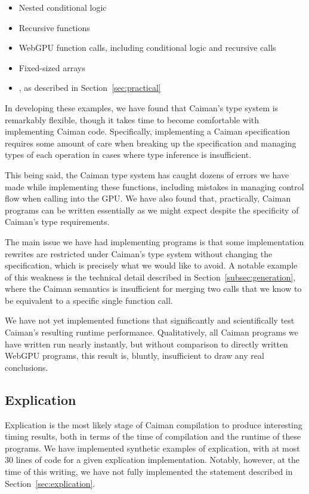 \begin{itemize}
\item Nested conditional logic
\item Recursive functions 
\item WebGPU function calls, including conditional logic and recursive calls
\item Fixed-sized arrays
\item {}, as described in Section~\ref{sec:practical}
\end{itemize}

In developing these examples, we have found that Caiman's type system is remarkably flexible, though it takes time to become comfortable with implementing Caiman code.  Specifically, implementing a Caiman specification requires some amount of care when breaking up the specification and managing types of each operation in cases where type inference is insufficient.  

This being said, the Caiman type system has caught dozens of errors we have made while implementing these functions, including mistakes in managing control flow when calling into the GPU.  We have also found that, practically, Caiman programs can be written essentially as we might expect despite the specificity of Caiman's type requirements.  

The main issue we have had implementing programs is that some implementation rewrites are restricted under Caiman's type system without changing the specification, which is precisely what we would like to avoid.  A notable example of this weakness is the technical detail described in Section~\ref{subsec:generation}, where the Caiman semantics is insufficient for merging two calls that we know to be equivalent to a specific single function call.

We have not yet implemented functions that significantly and scientifically test Caiman's resulting runtime performance.  Qualitatively, all Caiman programs we have written run nearly instantly, but without comparison to directly written WebGPU programs, this result is, bluntly, insufficient to draw any real conclusions.

\subsection{Explication}
\label{subsec:explicationresults}

Explication is the most likely stage of Caiman compilation to produce interesting timing results, both in terms of the time of compilation and the runtime of these programs.  We have implemented synthetic examples of explication, with at most 30 lines of code for a given explication implementation.  Notably, however, at the time of this writing, we have not fully implemented the  statement described in Section~\ref{sec:explication}.

